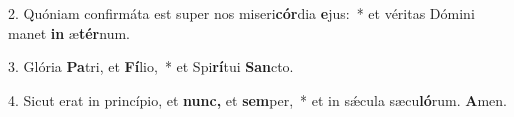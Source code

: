 \item 2. Quóniam confirmáta est super nos miseri\textbf{cór}dia \textbf{e}jus:~* et véritas Dómini manet \textbf{in} æ\textbf{tér}num.
\item 3. Glória \textbf{Pa}tri, et \textbf{Fí}lio,~* et Spi\textbf{rí}tui \textbf{San}cto.
\item 4. Sicut erat in princípio, et \textbf{nunc,} et \textbf{sem}per,~* et in sǽcula sæcu\textbf{ló}rum. \textbf{A}men.
